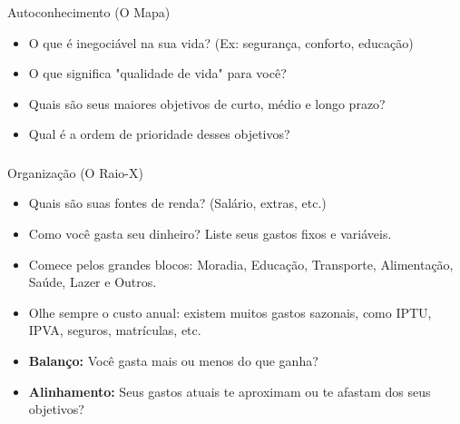 \begin{frame}[c]
  \frametitle{}

  \begin{block}{\Large \textcolor{blue}{}\quad Autoconhecimento (O Mapa)}

    \begin{itemize}
      \item O que é inegociável na sua vida? (Ex: segurança, conforto, educação) \pause
      \item O que significa "qualidade de vida" para você? \pause
      \item Quais são seus maiores objetivos de curto, médio e longo prazo? \pause
      \item Qual é a ordem de prioridade desses objetivos?
    \end{itemize}
  \end{block}
\end{frame}


\begin{frame}[c]
  \frametitle{}

  \begin{block}{\Large \textcolor{red}{}\quad Organização (O Raio-X)}

    \begin{itemize}
      \item Quais são suas fontes de renda? (Salário, extras, etc.)\pause
      \item Como você gasta seu dinheiro? Liste seus gastos fixos e variáveis.\pause
      \item Comece pelos grandes blocos: Moradia, Educação, Transporte, Alimentação, Saúde, Lazer e Outros.\pause
      \item Olhe sempre o custo anual: existem muitos gastos sazonais, como IPTU, IPVA, seguros, matrículas, etc.
      \item \textbf{Balanço:} Você gasta mais ou menos do que ganha?\pause
      \item \textbf{Alinhamento:} Seus gastos atuais te aproximam ou te afastam dos seus objetivos?
    \end{itemize}
  \end{block}
\end{frame}

